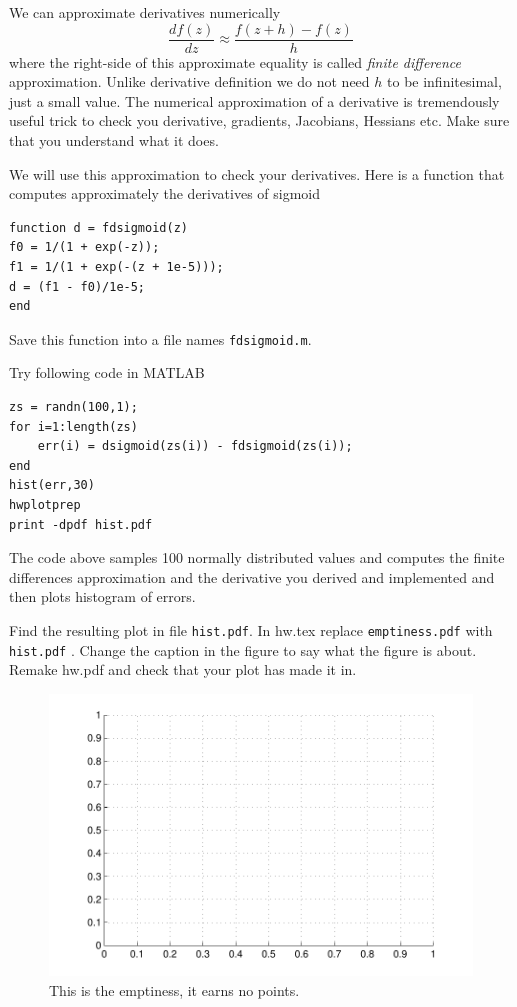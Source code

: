 \documentclass{article}
\begin{document}
\newproblem{1pt}
We can approximate derivatives numerically
\[
\frac{df(z)}{dz}\approx \frac{f(z+h) - f(z)}{h}
\]
where the right-side of this approximate equality is called {\em finite difference} approximation. Unlike derivative definition we do not need $h$ to be infinitesimal, just a small value. The numerical approximation of a derivative is tremendously useful trick to check you derivative, gradients, Jacobians, Hessians etc. Make sure that you understand what it does.

We will use this approximation to check your derivatives. Here is a function that computes approximately the derivatives of sigmoid
\begin{verbatim}
function d = fdsigmoid(z)
f0 = 1/(1 + exp(-z));
f1 = 1/(1 + exp(-(z + 1e-5)));
d = (f1 - f0)/1e-5;
end
\end{verbatim}
Save this function into a file names \texttt{fdsigmoid.m}.

Try following code in MATLAB
\begin{verbatim}
zs = randn(100,1);
for i=1:length(zs)
    err(i) = dsigmoid(zs(i)) - fdsigmoid(zs(i));
end
hist(err,30)
hwplotprep
print -dpdf hist.pdf
\end{verbatim}
The code above samples 100 normally distributed values and computes the finite differences approximation and the derivative you derived and implemented and then plots histogram of errors.

Find the resulting plot in file {\tt hist.pdf}. In hw\theHW.tex replace {\tt emptiness.pdf} with {\tt hist.pdf} . Change the
caption in the figure to say what the figure is about. Remake hw\theHW.pdf and check that your plot has made it in.
\begin{figure}[H]
\begin{center}
\includegraphics[scale=0.5]{emptiness.pdf}
\caption{This is the emptiness, it earns no points.}
\end{center}
\end{figure}
\end{document}
